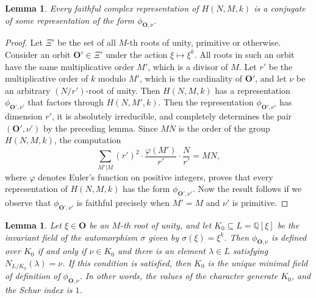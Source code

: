 \documentclass{article}
\newtheorem{lem}[prop]{Lemma}
\theoremstyle{definition}
\begin{document}
\begin{lem}\label{l23}
    Every faithful complex representation of $H(N,M,k)$ is a conjugate
    of some representation of the form $\phi_{\mathbf{O},\nu}$.
\end{lem}

\begin{proof}
    Let $\Xi'$ be the set of all $M$-th roots of unity, primitive or otherwise.
    Consider an orbit $\mathbf{O}'\in\Xi'$ under the
    action $\xi\mapsto\xi^k$. All roots in such an orbit have the
    same multiplicative order $M'$, which is a divisor of $M$.
    Let $r'$ be the multiplicative order of $k$ modulo $M'$,
    which is the cardinality of $\mathbf{O}'$,
    and let $\nu$ be an arbitrary $(N/r')$-root of unity. 
    Then $H(N,M,k)$ has a representation $\phi_{\mathbf{O}',\nu'}$
    that factors through $H(N,M',k)$. Then
    the representation $\phi_{\mathbf{O}',\nu'}$  has dimension $r'$, 
    it is absolutely irreducible, and completely determines the pair
    $(\mathbf{O}',\nu')$ by the preceding lemma.
    Since $MN$ is the order of the group $H(N,M,k)$,
    the computation
    $$\sum_{M'|M}(r')^2\cdot\frac{\varphi(M')}{r'}\cdot\frac N{r'}=MN,$$
    where $\varphi$ denotes Euler's function on positive integers,
    proves that every representation of $H(N,M,k)$ has the form 
    $\phi_{\mathbf{O}',\nu'}$. Now the result follows if we observe that
    $\phi_{\mathbf{O}',\nu'}$ is faithful precisely when $M'=M$ and
    $\nu'$ is primitive.
\end{proof}

\begin{lem}\label{l24}
    Let $\xi\in\mathbf{O}$ be an $M$-th root of unity, and
    let $K_0\subseteq L=\mathbb{Q}[\xi]$ be
    the invariant field of the automorphism 
    $\sigma$ given by $\sigma(\xi)=\xi^k$. Then $\phi_{\mathbf{O},\nu}$ 
    is defined over $K_0$ if and only if $\nu\in K_0$ and there
    is an element $\lambda\in L$ satisfying $N_{L/K_0}(\lambda)=\nu$.
    If this condition is satisfied, then $K_0$ is the unique minimal field of
    definition of $\phi_{\mathbf{O},\nu}$. In other words, the values of the
    character generate $K_0$, and the Schur index is $1$.
\end{lem}
\end{document}
